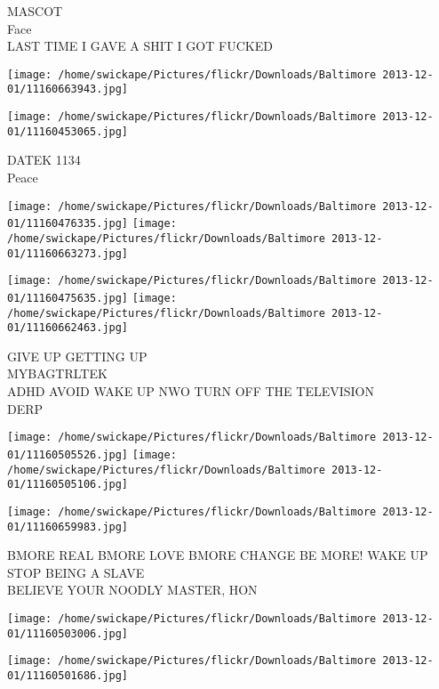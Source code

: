 \documentclass[10pt,letterpaper]{article}
\begin{document}
MASCOT\\
Face\\
LAST TIME I GAVE A SHIT I GOT FUCKED\\
\pagebreak

\texttt{[image: /home/swickape/Pictures/flickr/Downloads/Baltimore 2013-12-01/11160663943.jpg]}

\vspace{0.25in}
\texttt{[image: /home/swickape/Pictures/flickr/Downloads/Baltimore 2013-12-01/11160453065.jpg]}

DATEK 1134\\
Peace\\
\pagebreak

\texttt{[image: /home/swickape/Pictures/flickr/Downloads/Baltimore 2013-12-01/11160476335.jpg]}
\texttt{[image: /home/swickape/Pictures/flickr/Downloads/Baltimore 2013-12-01/11160663273.jpg]}

\texttt{[image: /home/swickape/Pictures/flickr/Downloads/Baltimore 2013-12-01/11160475635.jpg]}
\texttt{[image: /home/swickape/Pictures/flickr/Downloads/Baltimore 2013-12-01/11160662463.jpg]}

GIVE UP GETTING UP\\
MYBAGTRLTEK\\
ADHD AVOID WAKE UP NWO TURN OFF THE TELEVISION\\
DERP\\
\pagebreak

\texttt{[image: /home/swickape/Pictures/flickr/Downloads/Baltimore 2013-12-01/11160505526.jpg]}
\texttt{[image: /home/swickape/Pictures/flickr/Downloads/Baltimore 2013-12-01/11160505106.jpg]}

\vspace{0.25in}
\texttt{[image: /home/swickape/Pictures/flickr/Downloads/Baltimore 2013-12-01/11160659983.jpg]}

BMORE REAL BMORE LOVE BMORE CHANGE BE MORE! WAKE UP\\
STOP BEING A SLAVE\\
BELIEVE YOUR NOODLY MASTER, HON\\
\pagebreak

\texttt{[image: /home/swickape/Pictures/flickr/Downloads/Baltimore 2013-12-01/11160503006.jpg]}

\vspace{0.25in}
\texttt{[image: /home/swickape/Pictures/flickr/Downloads/Baltimore 2013-12-01/11160501686.jpg]}
\end{document}
